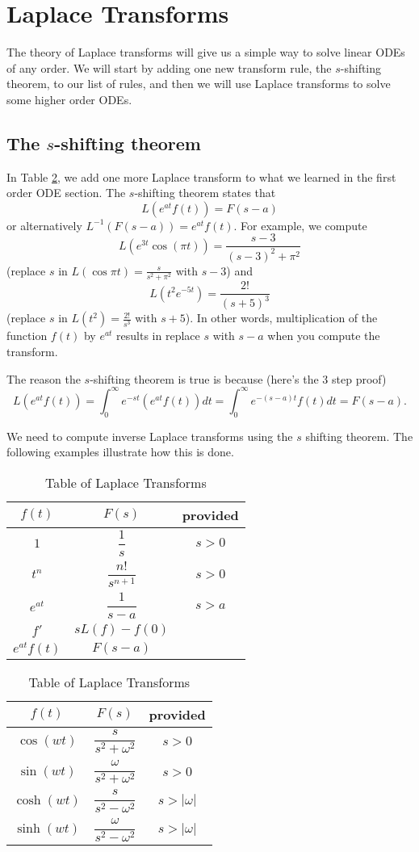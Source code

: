 \section{Laplace Transforms}
The theory of Laplace transforms will give us a simple way to solve linear ODEs of any order. We will start by adding one new transform rule, the $s$-shifting theorem, to our list of rules, and then we will use Laplace transforms to solve some higher order ODEs.
\subsection{The $s$-shifting theorem}

In Table \ref{laplacetable2}, we add one more Laplace transform to what we learned in the first order ODE section.
The $s$-shifting theorem states that $$L(e^{at}f(t))=F(s-a)$$ or alternatively $L^{-1}(F(s-a)) = e^{at}f(t)$. For example,
we compute $$L(e^{3t}\cos(\pi t)) = \frac{s-3}{(s-3)^2+\pi^2}$$ (replace $s$ in $L(\cos \pi t)=\frac{s}{s^2+\pi^2}$ with $s-3$) and $$L(t^2e^{-5t}) = \frac{2!}{(s+5)^3}$$ (replace $s$ in $L(t^2)=\frac{2!}{s^3}$ with $s+5$). In other words, multiplication of the function $f(t)$ by $e^{at}$ results in replace $s$ with $s-a$ when you compute the transform. 

The reason the $s$-shifting theorem is true is because (here's the 3 step proof) $$ L(e^{at}f(t)) = \int_0^\infty e^{-st}(e^{at}f(t))dt = \int_0^\infty e^{-(s-a)t}f(t)dt = F(s-a).$$ 


We need to compute inverse Laplace transforms using the $s$ shifting theorem. The following examples illustrate how this is done.

\begin{table}
\begin{center}
\begin{tabular}[t]{|c|cc|}
\hline
$f(t)$ & $F(s)$ & provided\\
\hline\hline
$1$					&$\dfrac{1}{s}$ 							&$s>0$\\\hline
$t^n$				&$\dfrac{n!}{s^{n+1}}$ 			&$s>0$\\\hline
$e^{at}$		&$\dfrac{1}{s-a}$ 			&$s>a$\\\hline
$f'$					&$sL(f)-f(0)$ 						&\\\hline
$e^{at}f(t)$  &$F(s-a)$ 						&\\\hline
\end{tabular}
\quad
\begin{tabular}[t]{|c|cc|}
\hline
$f(t)$ & $F(s)$ & provided\\
\hline\hline
$\cos(wt)$  &$\dfrac{s}{s^2+\omega^2}$ 			&$s>0$\\\hline
$\sin(wt)$  &$\dfrac{\omega}{s^2+\omega^2}$ 			&$s>0$\\\hline
$\cosh(wt)$ &$\dfrac{s}{s^2-\omega^2}$ 			&$s>|\omega|$\\\hline
$\sinh(wt)$ &$\dfrac{\omega}{s^2-\omega^2}$ 			&$s>|\omega|$\\\hline
\end{tabular}

\caption{Table of Laplace Transforms}
\label{laplacetable2}
\end{center}
\end{table}

